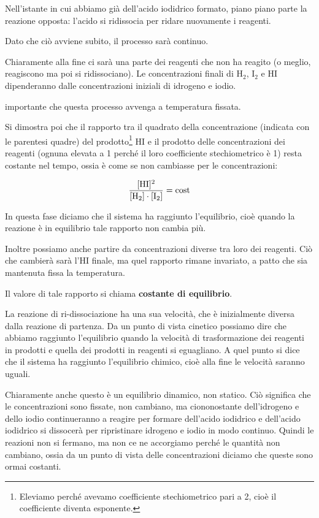 Nell'istante in cui abbiamo già dell'acido iodidrico formato, piano piano parte la reazione opposta: l'acido si ridissocia per ridare nuovamente i reagenti.

Dato che ciò avviene subito, il processo sarà continuo.

Chiaramente alla fine ci sarà una parte dei reagenti che non ha reagito (o meglio, reagiscono ma poi si ridissociano). Le concentrazioni finali di H$_2$, I$_2$ e HI dipenderanno dalle concentrazioni iniziali di idrogeno e iodio.

\E importante che questa processo avvenga a temperatura fissata.

Si dimostra poi che il rapporto tra il quadrato della concentrazione (indicata con le parentesi quadre) del prodotto\footnote{Eleviamo perché avevamo coefficiente stechiometrico pari a 2, cioè il coefficiente diventa esponente.} HI e il prodotto delle concentrazioni dei reagenti (ognuna elevata a 1 perché il loro coefficiente stechiometrico è 1) resta costante nel tempo, ossia è come se non cambiasse per le concentrazioni:

$$\rm \frac{[HI]^2}{[H_2] \cdot [I_2]}=\text{cost}$$

In questa fase diciamo che il sistema ha raggiunto l'equilibrio, cioè quando la reazione è in equilibrio tale rapporto non cambia più.

Inoltre possiamo anche partire da concentrazioni diverse tra loro dei reagenti. Ciò che cambierà sarà l'HI finale, ma quel rapporto rimane invariato, a patto che sia mantenuta fissa la temperatura.

Il valore di tale rapporto si chiama \textbf{costante di equilibrio}.

La reazione di ri-dissociazione ha una sua velocità, che è inizialmente diversa dalla reazione di partenza. Da un punto di vista cinetico possiamo dire che abbiamo raggiunto l'equilibrio quando la velocità di trasformazione dei reagenti in prodotti e quella dei prodotti in reagenti si eguagliano. A quel punto si dice che il sistema ha raggiunto l'equilibrio chimico, cioè alla fine le velocità saranno uguali.

Chiaramente anche questo è un equilibrio dinamico, non statico. Ciò significa che le concentrazioni sono fissate, non cambiano, ma ciononostante dell'idrogeno e dello iodio continueranno a reagire per formare dell'acido iodidrico e dell'acido iodidrico si dissocerà per ripristinare idrogeno e iodio in modo continuo. Quindi le reazioni non si fermano, ma non ce ne accorgiamo perché le quantità non cambiano, ossia da un punto di vista delle concentrazioni diciamo che queste sono ormai costanti.

